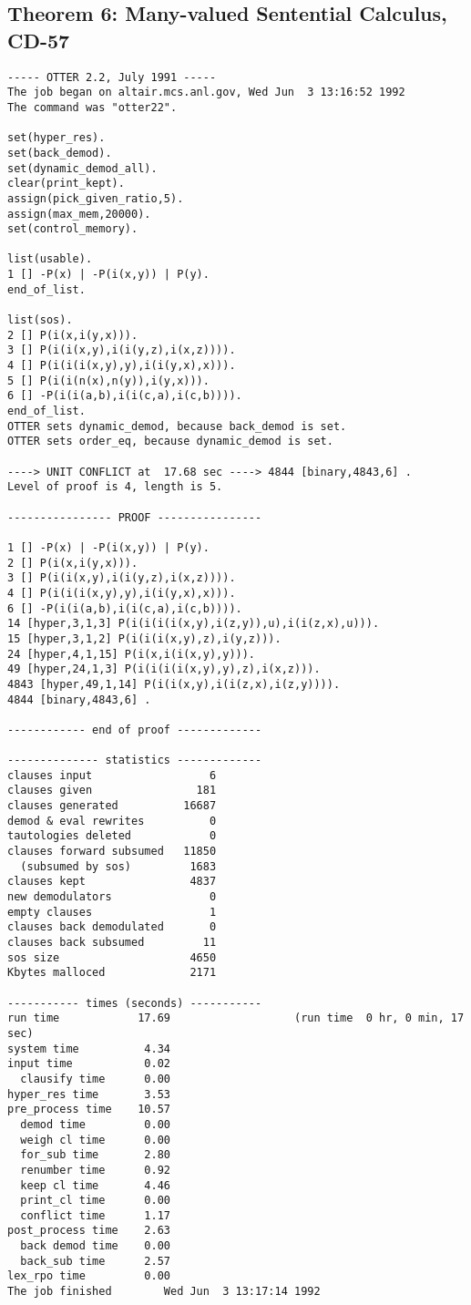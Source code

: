 \subsection{Theorem 6: Many-valued Sentential Calculus, CD-57}
{\small \begin{verbatim}
----- OTTER 2.2, July 1991 -----
The job began on altair.mcs.anl.gov, Wed Jun  3 13:16:52 1992
The command was "otter22".

set(hyper_res).
set(back_demod).
set(dynamic_demod_all).
clear(print_kept).
assign(pick_given_ratio,5).
assign(max_mem,20000).
set(control_memory).

list(usable).
1 [] -P(x) | -P(i(x,y)) | P(y).
end_of_list.

list(sos).
2 [] P(i(x,i(y,x))).
3 [] P(i(i(x,y),i(i(y,z),i(x,z)))).
4 [] P(i(i(i(x,y),y),i(i(y,x),x))).
5 [] P(i(i(n(x),n(y)),i(y,x))).
6 [] -P(i(i(a,b),i(i(c,a),i(c,b)))).
end_of_list.
OTTER sets dynamic_demod, because back_demod is set.
OTTER sets order_eq, because dynamic_demod is set.

----> UNIT CONFLICT at  17.68 sec ----> 4844 [binary,4843,6] .
Level of proof is 4, length is 5.

---------------- PROOF ----------------

1 [] -P(x) | -P(i(x,y)) | P(y).
2 [] P(i(x,i(y,x))).
3 [] P(i(i(x,y),i(i(y,z),i(x,z)))).
4 [] P(i(i(i(x,y),y),i(i(y,x),x))).
6 [] -P(i(i(a,b),i(i(c,a),i(c,b)))).
14 [hyper,3,1,3] P(i(i(i(i(x,y),i(z,y)),u),i(i(z,x),u))).
15 [hyper,3,1,2] P(i(i(i(x,y),z),i(y,z))).
24 [hyper,4,1,15] P(i(x,i(i(x,y),y))).
49 [hyper,24,1,3] P(i(i(i(i(x,y),y),z),i(x,z))).
4843 [hyper,49,1,14] P(i(i(x,y),i(i(z,x),i(z,y)))).
4844 [binary,4843,6] .

------------ end of proof -------------

-------------- statistics -------------
clauses input                  6
clauses given                181
clauses generated          16687
demod & eval rewrites          0
tautologies deleted            0
clauses forward subsumed   11850
  (subsumed by sos)         1683
clauses kept                4837
new demodulators               0
empty clauses                  1
clauses back demodulated       0
clauses back subsumed         11
sos size                    4650
Kbytes malloced             2171

----------- times (seconds) -----------
run time            17.69                   (run time  0 hr, 0 min, 17 sec)
system time          4.34
input time           0.02
  clausify time      0.00
hyper_res time       3.53
pre_process time    10.57
  demod time         0.00
  weigh cl time      0.00
  for_sub time       2.80
  renumber time      0.92
  keep cl time       4.46
  print_cl time      0.00
  conflict time      1.17
post_process time    2.63
  back demod time    0.00
  back_sub time      2.57
lex_rpo time         0.00
The job finished        Wed Jun  3 13:17:14 1992
\end{verbatim} }

